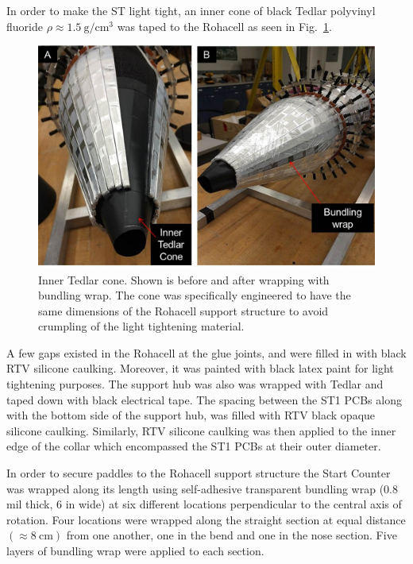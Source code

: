 In order to make the ST light tight, an inner cone of black Tedlar polyvinyl fluoride $\rho \approx 1.5\ \mathrm{g/cm^{3}}$ \cite{tedlar_pvf} was taped to the Rohacell as seen in Fig.~\ref{fig:light_tightening_cone}. 
\begin{figure}[!htb]
	\centering
	\includegraphics[width=1.0\columnwidth]{fabrication/figs/st_lt_ic_bw}
	\caption{Inner Tedlar cone.  Shown is before and after wrapping with bundling wrap.  The cone was specifically engineered to have the same dimensions of the Rohacell support structure to avoid crumpling of the light tightening material.}
	\label{fig:light_tightening_cone}
\end{figure}
A few gaps existed in the Rohacell at the glue joints, and were filled in with black RTV silicone caulking. Moreover, it was painted with black latex paint for light tightening purposes.  The support hub was also was wrapped with Tedlar and taped down with black electrical tape. The spacing between the ST1 PCBs along with the bottom side of the support hub, was filled with RTV black opaque silicone caulking.  Similarly, RTV silicone caulking was then applied to the inner edge of the collar which encompassed the ST1 PCBs at their outer diameter.

In order to secure paddles to the Rohacell support structure the Start Counter was wrapped along its length using self-adhesive transparent bundling wrap (0.8 mil thick, 6 in wide) at six different locations perpendicular to the central axis of rotation. Four locations were wrapped along the straight section at equal distance $(\approx 8\ \mathrm{cm})$ from one another, one in the bend and one in the nose section.  Five layers of bundling wrap were applied to each section.%

